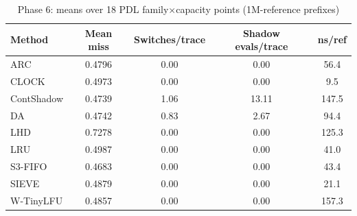 \begin{table}[t]
\caption{Phase 6: means over 18 PDL family$\times$capacity points (1M-reference prefixes)}
\label{tab:pdl_all}
\centering\footnotesize
\begin{tabular}{@{}lcccc@{}}
\toprule
Method & Mean miss & Switches/trace & Shadow evals/trace & ns/ref \\
\midrule
ARC & 0.4796 & 0.00 & 0.00 & 56.4 \\
CLOCK & 0.4973 & 0.00 & 0.00 & 9.5 \\
ContShadow & 0.4739 & 1.06 & 13.11 & 147.5 \\
DA & 0.4742 & 0.83 & 2.67 & 94.4 \\
LHD & 0.7278 & 0.00 & 0.00 & 125.3 \\
LRU & 0.4987 & 0.00 & 0.00 & 41.0 \\
S3-FIFO & 0.4683 & 0.00 & 0.00 & 43.4 \\
SIEVE & 0.4879 & 0.00 & 0.00 & 21.1 \\
W-TinyLFU & 0.4857 & 0.00 & 0.00 & 157.3 \\
\bottomrule
\end{tabular}
\end{table}
